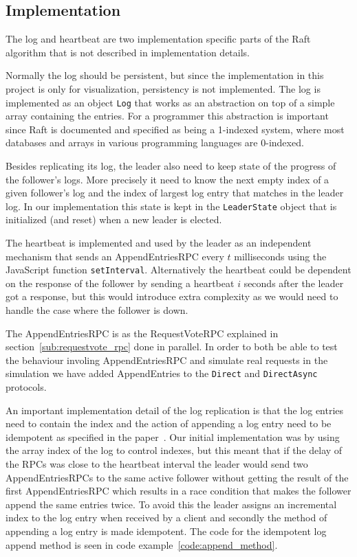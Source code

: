 
\subsection{Implementation} %
\label{sub:log_replication_implementation}

The log and heartbeat are two implementation specific parts of the Raft algorithm that is not described in implementation details.

Normally the log should be persistent, but since the implementation in this project is only for visualization, persistency is not implemented. The log is implemented as an object \verb$Log$ that works as an abstraction on top of a simple array containing the entries. For a programmer this abstraction is important since Raft is documented and specified as being a 1-indexed system, where most databases and arrays in various programming languages are 0-indexed.

Besides replicating its log, the leader also need to keep state of the progress of the follower's logs. More precisely it need to know the next empty index of a given follower's log and the index of largest log entry that matches in the leader log. In our implementation this state is kept in the \verb$LeaderState$ object that is initialized (and reset) when a new leader is elected.

The heartbeat is implemented and used by the leader as an independent mechanism that sends an AppendEntriesRPC every $t$ milliseconds using the JavaScript function \verb$setInterval$. Alternatively the heartbeat could be dependent on the response of the follower by sending a heartbeat $i$ seconds after the leader got a response, but this would introduce extra complexity as we would need to handle the case where the follower is down.

The AppendEntriesRPC is as the RequestVoteRPC explained in section~\ref{sub:requestvote_rpc} done in parallel. In order to both be able to test the behaviour involing AppendEntriesRPC and simulate real requests in the simulation we have added AppendEntries to the \verb$Direct$ and \verb$DirectAsync$ protocols.

An important implementation detail of the log replication is that the log entries need to contain the index and the action of appending a log entry need to be idempotent as specified in the paper~\cite[p.~10]{Raft}. Our initial implementation was by using the array index of the log to control indexes, but this meant that if the delay of the RPCs was close to the heartbeat interval the leader would send two AppendEntriesRPCs to the same active follower without getting the result of the first AppendEntriesRPC which results in a race condition that makes the follower append the same entries twice. To avoid this the leader assigns an incremental index to the log entry when received by a client and secondly the method of appending a log entry is made idempotent. The code for the idempotent log append method is seen in code example~\ref{code:append_method}.

